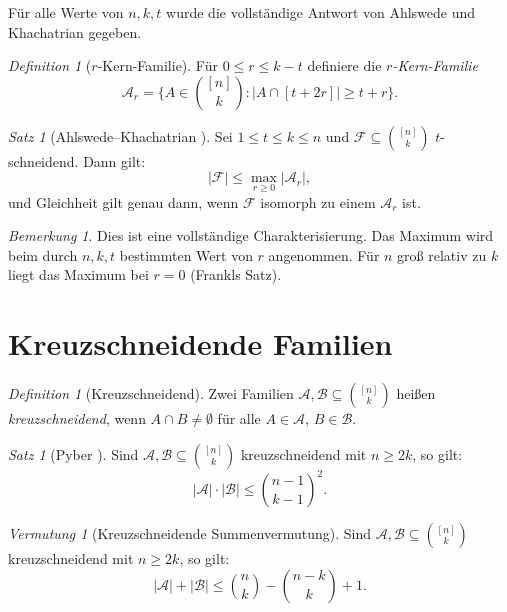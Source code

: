 \documentclass[12pt,a4paper]{amsart}
\theoremstyle{definition}
\theoremstyle{remark}
\newtheorem{satz}[theorem]{Satz}
\newtheorem{vermutung}[theorem]{Vermutung}
\newtheorem{bemerkung}[theorem]{Bemerkung}
\newtheorem{definition_de}[theorem]{Definition}
\begin{document}
Für alle Werte von $n, k, t$ wurde die vollständige Antwort von Ahlswede und
Khachatrian gegeben.

\begin{definition_de}[$r$-Kern-Familie]
Für $0 \leq r \leq k-t$ definiere die \emph{$r$-Kern-Familie}
\[
  \mathcal{A}_r = \{A \in \binom{[n]}{k} : |A \cap [t+2r]| \geq t+r\}.
\]
\end{definition_de}

\begin{satz}[Ahlswede--Khachatrian \cite{AhlswedeKhachatrian1997}]\label{satz:ak}
Sei $1 \leq t \leq k \leq n$ und $\mathcal{F} \subseteq \binom{[n]}{k}$
$t$-schneidend. Dann gilt:
\[
  |\mathcal{F}| \leq \max_{r \geq 0} |\mathcal{A}_r|,
\]
und Gleichheit gilt genau dann, wenn $\mathcal{F}$ isomorph zu einem $\mathcal{A}_r$ ist.
\end{satz}

\begin{bemerkung}
Dies ist eine vollständige Charakterisierung. Das Maximum wird beim durch $n, k, t$
bestimmten Wert von $r$ angenommen. Für $n$ groß relativ zu $k$ liegt das Maximum
bei $r=0$ (Frankls Satz).
\end{bemerkung}

\section{Kreuzschneidende Familien}\label{sec:kreuz}

\begin{definition_de}[Kreuzschneidend]
Zwei Familien $\mathcal{A}, \mathcal{B} \subseteq \binom{[n]}{k}$ heißen
\emph{kreuzschneidend}, wenn $A \cap B \neq \emptyset$ für alle $A \in \mathcal{A}$,
$B \in \mathcal{B}$.
\end{definition_de}

\begin{satz}[Pyber \cite{Pyber1986}]\label{satz:pyber}
Sind $\mathcal{A}, \mathcal{B} \subseteq \binom{[n]}{k}$ kreuzschneidend mit
$n \geq 2k$, so gilt:
\[
  |\mathcal{A}| \cdot |\mathcal{B}| \leq \binom{n-1}{k-1}^2.
\]
\end{satz}

\begin{vermutung}[Kreuzschneidende Summenvermutung]\label{verm:kreuz_summe}
Sind $\mathcal{A}, \mathcal{B} \subseteq \binom{[n]}{k}$ kreuzschneidend mit
$n \geq 2k$, so gilt:
\[
  |\mathcal{A}| + |\mathcal{B}| \leq \binom{n}{k} - \binom{n-k}{k} + 1.
\]
\end{vermutung}
\end{document}
